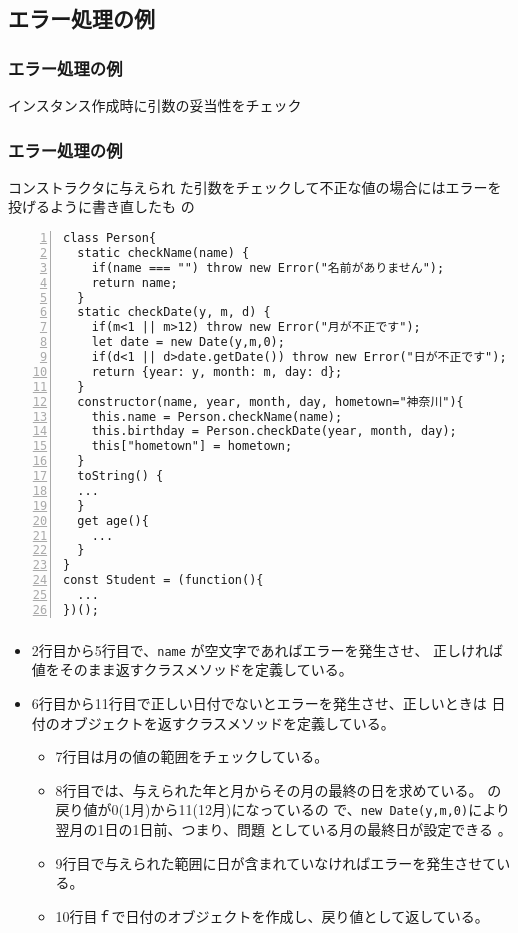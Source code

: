 \begin{frame}[containsverbatim]
\subsection{エラー処理の例}
\begin{frame}[containsverbatim]
 \frametitle{エラー処理の例}
 インスタンス作成時に引数の妥当性をチェック
\end{frame}
\begin{frame}[containsverbatim]
 \frametitle{エラー処理の例}
コンストラクタに与えられ
	た引数をチェックして不正な値の場合にはエラーを投げるように書き直したも
 の
\begin{Verbatim}[numbers=left]
class Person{
  static checkName(name) {
    if(name === "") throw new Error("名前がありません");
    return name;
  }
  static checkDate(y, m, d) {
    if(m<1 || m>12) throw new Error("月が不正です");
    let date = new Date(y,m,0);
    if(d<1 || d>date.getDate()) throw new Error("日が不正です");
    return {year: y, month: m, day: d};
  }
  constructor(name, year, month, day, hometown="神奈川"){
    this.name = Person.checkName(name);
    this.birthday = Person.checkDate(year, month, day);
    this["hometown"] = hometown;
  }
  toString() {
  ...
  }
  get age(){
    ...
  }
}
const Student = (function(){
  ...
})();
\end{Verbatim}
\end{frame}
\begin{frame}[containsverbatim]
 \frametitle{}
\begin{itemize}
 \item 2行目から5行目で、\texttt{name} が空文字であればエラーを発生させ、
       正しければ値をそのまま返すクラスメソッドを定義している。
 \item 6行目から11行目で正しい日付でないとエラーを発生させ、正しいときは
       日付のオブジェクトを返すクラスメソッドを定義している。
       \begin{itemize}
        \item 7行目は月の値の範囲をチェックしている。
 \item 8行目では、与えられた年と月からその月の最終の日を求めている。
			 の戻り値が0(1月)から11(12月)になっているの
			 で、\texttt{new Date(y,m,0)}により翌月の1日の1日前、つまり、問題
			 としている月の最終日が設定できる
       。
 \item 9行目で与えられた範囲に日が含まれていなければエラーを発生させてい
			 る。
        \item 10行目ｆで日付のオブジェクトを作成し、戻り値として返している。

\end{itemize}
\end{itemize}
\end{frame}
\end{frame}
